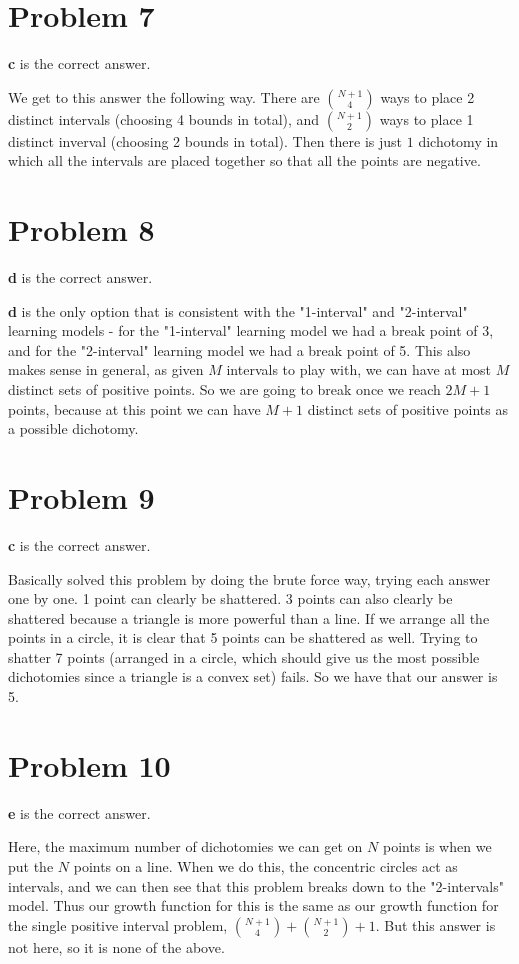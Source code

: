 \documentclass{article}
\begin{document}
\section*{Problem 7}
\textbf{c} is the correct answer.

\noindent We get to this answer the following way. There are $\binom{N+1}{4}$
ways to place 2 distinct intervals (choosing 4 bounds in total),
and $\binom{N+1}{2}$ ways to place 1 distinct inverval (choosing 2 bounds in
total). Then there is just $1$ dichotomy in which all the intervals are placed
together so that all the points are negative.
\section*{Problem 8}
\textbf{d} is the correct answer.

\noindent \textbf{d} is the only option that is consistent with the "1-interval"
and "2-interval" learning models - for the "1-interval" learning model we had
a break point of 3, and for the "2-interval" learning model we had a break point
of 5. This also makes sense in general, as given $M$ intervals to play with,
we can have at most $M$ distinct sets of positive points. So we are going to break
once we reach $2M + 1$ points, because at this point we can have $M+1$ distinct
sets of positive points as a possible dichotomy.
\section*{Problem 9}
\textbf{c} is the correct answer.

\noindent Basically solved this problem by doing the brute force way, trying
each answer one by one. 1 point can clearly be shattered. 3 points can also
clearly be shattered because a triangle is more powerful than a line. If we
arrange all the points in a circle, it is clear that 5 points can be shattered
as well. Trying to shatter 7 points (arranged in a circle, which should give
us the most possible dichotomies since a triangle is a convex set) fails.
So we have that our answer is 5.

\section*{Problem 10}
\textbf{e} is the correct answer.

\noindent Here, the maximum number of dichotomies we can get on $N$ points
is when we put the $N$ points on a line. When we do this, the concentric circles
act as intervals, and we can then see that this problem breaks down to
the "2-intervals" model. Thus our growth function for this is
the same as our growth function for the single positive interval problem,
$\binom{N+1}{4} + \binom{N+1}{2} + 1$. But this answer is not here, so it
is none of the above.
\end{document}
